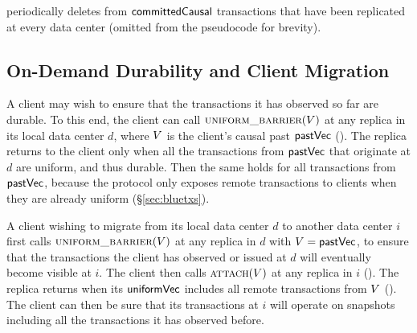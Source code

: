 \System periodically deletes from ${\sf committedCausal}$ transactions that have been
replicated at every data center (omitted from the pseudocode for brevity).


\subsection{On-Demand Durability and Client Migration}
\label{sec:clientmigration}


A client may wish to ensure that the transactions it has observed so far are
durable. To this end, the client can call $\MAKEUNIFORM(\avc)$ at any replica in
its local data center $d$, where $\avc$ is the client's causal past ${\sf pastVec}$
(). The replica returns to the client only
when all the transactions from ${\sf pastVec}$ that originate at $d$ are uniform, and
thus durable. Then the same holds for all transactions from ${\sf pastVec}$, because the
protocol only exposes remote transactions to clients when they are already
uniform (\S\ref{sec:bluetxs}).






A client wishing to migrate from its local data center $d$ to another data
center $i$ first calls $\MAKEUNIFORM(\avc)$ at any replica in $d$ with
$\avc = \past$, to ensure that the transactions the client has observed or
issued at $d$ will eventually become visible at $i$. The client then calls
$\ATTACH(\avc)$ at any replica in $i$ %
(). The replica returns when its
${\sf uniformVec}$ includes all remote transactions from $\avc$
(). The client can then be sure that its
transactions at $i$ will operate on snapshots including all the transactions it
has observed before.








